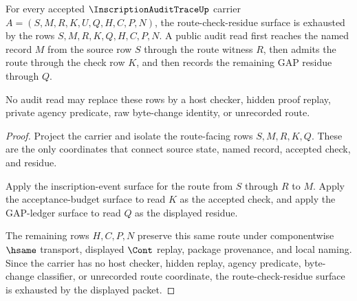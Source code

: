 \begin{theorem}
\label{thm:inscription-audit-trace-route-check-residue-exhaustion}
For every accepted $\InscriptionAuditTraceUp$ carrier $A=(S,M,R,K,U,Q,H,C,P,N)$, the route-check-residue surface is exhausted by the rows $S,M,R,K,Q,H,C,P,N$. A public audit read first reaches the named record $M$ from the source row $S$ through the route witness $R$, then admits the route through the check row $K$, and then records the remaining GAP residue through $Q$.

No audit read may replace these rows by a host checker, hidden proof replay, private agency predicate, raw byte-change identity, or unrecorded route.
\end{theorem}
\begin{proof}
Project the carrier and isolate the route-facing rows $S,M,R,K,Q$. These are the only coordinates that connect source state, named record, accepted check, and residue.

Apply the inscription-event surface for the route from $S$ through $R$ to $M$. Apply the acceptance-budget surface to read $K$ as the accepted check, and apply the GAP-ledger surface to read $Q$ as the displayed residue.

The remaining rows $H,C,P,N$ preserve this same route under componentwise $\hsame$ transport, displayed $\Cont$ replay, package provenance, and local naming. Since the carrier has no host checker, hidden replay, agency predicate, byte-change classifier, or unrecorded route coordinate, the route-check-residue surface is exhausted by the displayed packet.
\end{proof}

